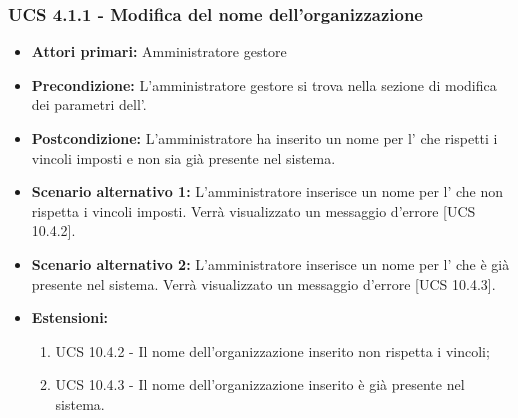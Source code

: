 \subsubsection{UCS 4.1.1 - Modifica del nome dell'organizzazione}%
\begin{itemize}
\item \textbf{Attori primari:} Amministratore gestore
\item \textbf{Precondizione:} L'amministratore gestore si trova nella sezione di modifica dei parametri dell'.
\item \textbf{Postcondizione:} L'amministratore ha inserito un nome per l' che rispetti i vincoli imposti e non sia già presente nel sistema.
\item \textbf{Scenario alternativo 1:} L'amministratore inserisce un nome per l' che non rispetta i vincoli imposti. Verrà visualizzato un messaggio d'errore [UCS 10.4.2].
\item \textbf{Scenario alternativo 2:} L'amministratore inserisce un nome per l' che è già presente nel sistema. Verrà visualizzato un messaggio d'errore [UCS 10.4.3].
\item \textbf{Estensioni:}
\begin{enumerate}
    \item UCS 10.4.2 - Il nome dell'organizzazione inserito non rispetta i vincoli;
    \item UCS 10.4.3 - Il nome dell'organizzazione inserito è già presente nel sistema.
\end{enumerate}
\end{itemize}

